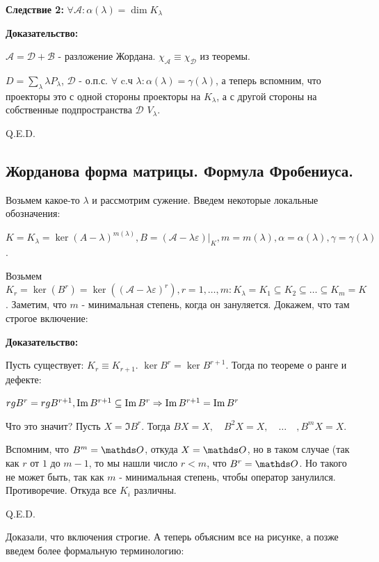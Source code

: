 \textbf{Следствие 2:} $\forall \mathcal{A} :\alpha(\lambda) = \dim K_{\lambda}$

\textbf{Доказательство:}

$\mathcal{A} = \mathcal{D} + \mathcal{B}$ - разложение Жордана. $\chi_{\mathcal{A}}\equiv \chi_{\mathcal{D}}$ из теоремы.

$D = \sum\limits_{\lambda}\lambda P_{\lambda}$, $\mathcal{D}$ - о.п.с. $\forall $ c.ч $\lambda: \alpha(\lambda) = \gamma(\lambda)$, а теперь вспомним, что проекторы это с одной стороны проекторы на $K_{\lambda}$, а с другой стороны на собственные подпространства $\mathcal{D}$ $V_{\lambda}$.

\hfill Q.E.D.

\pagebreak

\subsection{Жорданова форма матрицы. Формула Фробениуса. }

Возьмем какое-то $\lambda$ и рассмотрим сужение. Введем некоторые локальные обозначения:

$K=K_{\lambda} = \ker (A-\lambda)^{m(\lambda)},B = (\mathcal{A}-\lambda\varepsilon)\Big|_{K},m = m(\lambda),\alpha= \alpha(\lambda),\gamma=\gamma(\lambda)$.

Возьмем $K_r = \ker(B^r) = \ker((\mathcal{A}-\lambda\varepsilon)^r),r= 1,\ldots, m: K_\lambda = K_1 \subseteq K_2 \subseteq\ldots \subseteq K_m = K $. Заметим, что $m$ - минимальная степень, когда он зануляется. Докажем, что там строгое включение:

\textbf{Доказательство:}

Пусть существует: $K_r \equiv K_{r+1}$. $\ker B^r = \ker B^{r+1}$. Тогда по теореме о ранге и дефекте:

$rg B^r = rg B^{r+1}, \operatorname{Im} B^{r+1} \subseteq \operatorname{Im} B^r\Rightarrow \operatorname{Im} B^{r+1} =\operatorname{Im} B^r $

Что это значит?  Пусть $X = \Im B^r$. Тогда $BX = X,\quad B^2X = X, \quad \ldots \quad, B^mX=X $.

Вспомним, что $B^m = \zero$, откуда $X = \zero$, но в таком случае (так как $r$ от $1$ до $m-1$, то мы нашли число $r<m$, что $B^r=\zero$. Но такого не может быть, так как $m$ - минимальная степень, чтобы оператор занулился. Противоречие. Откуда все $K_i$ различны.

\hfill Q.E.D.

Доказали, что включения строгие. А теперь объясним все на рисунке, а позже введем более формальную терминологию:

